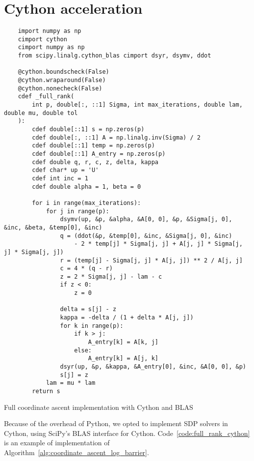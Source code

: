 \chapter{Cython acceleration}\label{ch:cython_acceleration}
\begin{calgorithm}
\begin{verbatim}
    import numpy as np
    cimport cython
    cimport numpy as np
    from scipy.linalg.cython_blas cimport dsyr, dsymv, ddot

    @cython.boundscheck(False)
    @cython.wraparound(False)
    @cython.nonecheck(False)
    cdef _full_rank(
        int p, double[:, ::1] Sigma, int max_iterations, double lam, double mu, double tol
    ):
        cdef double[::1] s = np.zeros(p)
        cdef double[:, ::1] A = np.linalg.inv(Sigma) / 2
        cdef double[::1] temp = np.zeros(p)
        cdef double[::1] A_entry = np.zeros(p)
        cdef double q, r, c, z, delta, kappa
        cdef char* up = 'U'
        cdef int inc = 1
        cdef double alpha = 1, beta = 0

        for i in range(max_iterations):
            for j in range(p):
                dsymv(up, &p, &alpha, &A[0, 0], &p, &Sigma[j, 0], &inc, &beta, &temp[0], &inc)
                q = (ddot(&p, &temp[0], &inc, &Sigma[j, 0], &inc)
                    - 2 * temp[j] * Sigma[j, j] + A[j, j] * Sigma[j, j] * Sigma[j, j])
                r = (temp[j] - Sigma[j, j] * A[j, j]) ** 2 / A[j, j]
                c = 4 * (q - r)
                z = 2 * Sigma[j, j] - lam - c
                if z < 0:
                    z = 0

                delta = s[j] - z
                kappa = -delta / (1 + delta * A[j, j])
                for k in range(p):
                    if k > j:
                        A_entry[k] = A[k, j]
                    else:
                        A_entry[k] = A[j, k]
                dsyr(up, &p, &kappa, &A_entry[0], &inc, &A[0, 0], &p)
                s[j] = z
            lam = mu * lam
        return s
\end{verbatim}
\caption{
    Full coordinate ascent implementation with Cython and BLAS
}\label{code:full_rank_cython}
\end{calgorithm}
Because of the overhead of Python, we opted to implement SDP solvers in Cython,
using SciPy's BLAS interface for Cython.
Code~\ref{code:full_rank_cython} is an example of implementation of Algorithm~\ref{alg:coordinate_ascent_log_barrier}.
